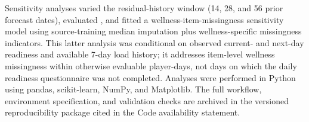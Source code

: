 Sensitivity analyses varied the residual-history window (14, 28, and 56 prior forecast dates), evaluated \Ptwo, and fitted a wellness-item-missingness sensitivity model using source-training median imputation plus wellness-specific missingness indicators. This latter analysis was conditional on observed current- and next-day readiness and available 7-day load history; it addresses item-level wellness missingness within otherwise evaluable player-days, not days on which the daily readiness questionnaire was not completed. Analyses were performed in Python using pandas, scikit-learn, NumPy, and Matplotlib. The full workflow, environment specification, and validation checks are archived in the versioned reproducibility package cited in the Code availability statement.
